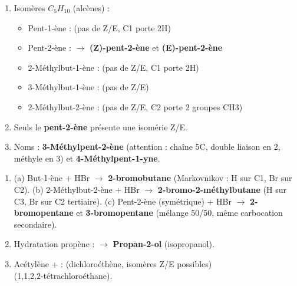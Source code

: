 \documentclass[11pt]{article}
\begin{document}
\begin{corrige}[Exercice 1]
\begin{enumerate}
  \item Isomères $C_5H_{10}$ (alcènes) :
  \begin{itemize}
    \item Pent-1-ène :  (pas de Z/E, C1 porte 2H)
    \item Pent-2-ène :  $\to$ \textbf{(Z)-pent-2-ène} et \textbf{(E)-pent-2-ène}
    \item 2-Méthylbut-1-ène :  (pas de Z/E, C1 porte 2H)
    \item 3-Méthylbut-1-ène :  (pas de Z/E)
    \item 2-Méthylbut-2-ène :  (pas de Z/E, C2 porte 2 groupes CH3)
  \end{itemize}
  \item Seuls le \textbf{pent-2-ène} présente une isomérie Z/E.
  \item Noms : \textbf{3-Méthylpent-2-ène} (attention : chaîne 5C, double liaison en 2, méthyle en 3) et \textbf{4-Méthylpent-1-yne}.
\end{enumerate}
\end{corrige}

\begin{corrige}[Exercice 2]
\begin{enumerate}
  \item (a) But-1-ène  + HBr $\to$ \textbf{2-bromobutane} (Markovnikov : H sur C1, Br sur C2).
  (b) 2-Méthylbut-2-ène  + HBr $\to$ \textbf{2-bromo-2-méthylbutane} (H sur C3, Br sur C2 tertiaire).
  (c) Pent-2-ène  (symétrique) + HBr $\to$ \textbf{2-bromopentane} et \textbf{3-bromopentane} (mélange 50/50, même carbocation secondaire).
  \item Hydratation propène :  $\to$ \textbf{Propan-2-ol} (isopropanol).
  \item Acétylène +  :
   (dichloroéthène, isomères Z/E possibles) \\
   (1,1,2,2-tétrachloroéthane).
\end{enumerate}
\end{corrige}
\end{document}
